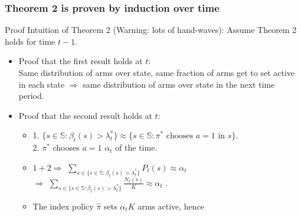 \documentclass{beamer}
\newcommand{\substates}{\mathbb{S}}
\begin{document}
\begin{frame}[plain]
\frametitle{Theorem 2 is proven by induction over time}
Proof Intuition of Theorem 2 (Warning: lots of hand-waves):
Assume Theorem 2 holds for time $t-1$.
\begin{itemize}
\item Proof that the first result holds at $t$:\\
Same distribution of arms over state, same fraction of arms get to set active in each state $\Rightarrow$ same distribution of arms over state in the next time period.
\item Proof that the second result holds at $t$:\\
\begin{itemize}
\item 1. $\{s\in \substates: \beta_t(s)>\lambda^*_t\}\approx \{s\in \substates: \pi^{*} \text{ chooses } a=1 \text{ in } s\}$.\\
\hspace{0.05cm}2. $\pi^{*}$ chooses $a=1$ $\alpha_t$ of the time.
\item $1 + 2\Rightarrow$ $\sum_{s\in \{s\in \substates: \beta_t(s)>\lambda^*_t\}}P_t(s)\approx\alpha_t$ \\
$\Rightarrow$  $\sum_{s\in \{s\in \substates: \beta_t(s)>\lambda^*_t\}}\frac{N_t(s)}{K}\approx\alpha_t$ .
\item The index policy $\hat{\pi}$ sets $\alpha_t K$ arms active, hence 
\end{itemize}
\end{itemize}
\end{frame}
\end{document}
